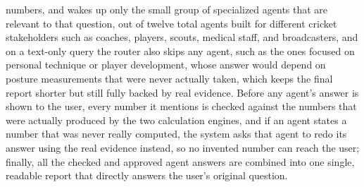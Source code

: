 numbers, and wakes up only the small group of specialized agents that are relevant to that question, out of twelve total agents built for different cricket stakeholders such as coaches, players, scouts, medical staff, and broadcasters, and on a text-only query the router also skips any agent, such as the ones focused on personal technique or player development, whose answer would depend on posture measurements that were never actually taken, which keeps the final report shorter but still fully backed by real evidence. Before any agent's answer is shown to the user, every number it mentions is checked against the numbers that were actually produced by the two calculation engines, and if an agent states a number that was never really computed, the system asks that agent to redo its answer using the real evidence instead, so no invented number can reach the user; finally, all the checked and approved agent answers are combined into one single, readable report that directly answers the user's original question.